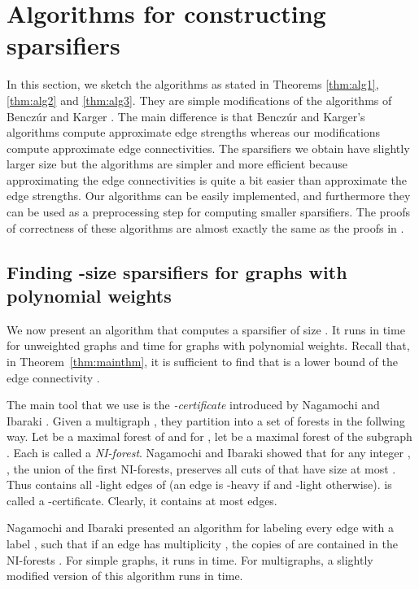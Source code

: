 \documentclass[11pt]{article}
\numberwithin{equation}{section}
\newcommand{\AppendixName}[1]{\label{app:#1}}
\newcommand{\Theorem}[1]{Theorem~\ref{thm:#1}}
\begin{document}
\section{Algorithms for constructing sparsifiers}
\AppendixName{SketchAlgorithms}

In this section,
we sketch the algorithms as stated in Theorems \ref{thm:alg1}, \ref{thm:alg2} and \ref{thm:alg3}.
They are simple modifications of the algorithms of Bencz\'ur and Karger \cite{BK}.
The main difference is that Bencz\'ur and Karger's algorithms compute approximate edge strengths
whereas our modifications compute approximate edge connectivities.
The sparsifiers we obtain have slightly larger size but the algorithms are simpler and more efficient
because approximating the edge connectivities is quite a bit easier
than approximate the edge strengths.
Our algorithms can be easily implemented, and furthermore they can be used as a preprocessing step
for computing smaller sparsifiers.
The proofs of correctness of these algorithms are almost exactly the
same as the proofs in \cite{BK}.


\subsection{Finding -size sparsifiers for graphs with polynomial weights}

We now present an algorithm that computes a sparsifier of size .
It runs in  time for unweighted graphs and 
 time for graphs with polynomial weights.
Recall that, in \Theorem{mainthm},
it is sufficient to find  
that is a lower bound of the edge connectivity .

The main tool that we use is the \emph{-certificate}
introduced by Nagamochi and Ibaraki \cite{NIForest1}.
Given a multigraph , they partition  into a set of forests
 in the follwing way.
Let  be a maximal forest of 
and for , let  be a maximal forest of the subgraph .
Each  is called a \emph{NI-forest}.
Nagamochi and Ibaraki showed that for any integer ,
,
the union of the first  NI-forests, preserves all cuts of 
that have size at most .
Thus  contains all -light edges of 
(an edge  is -heavy if  and -light otherwise).
 is called a -certificate.
Clearly, it contains at most  edges.

Nagamochi and Ibaraki \cite{NIForest1} presented an algorithm for labeling 
every edge  with a label ,
such that if an edge  has multiplicity , the  copies of 
are contained in the  NI-forests .
For simple graphs, it runs in  time.
For multigraphs, a slightly modified version \cite{NIForest2} of this algorithm runs in
 time.
\end{document}
